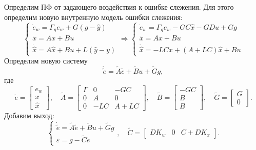 Определим ПФ от задающего воздействия к ошибке слежения. Для этого определим новую 
внутренную модель ошибки слежения:
\begin{equation*}
    \begin{cases}
        \dot e_w=\Gamma_ge_w+G(g-\hat y)\\
        \dot x=Ax+Bu\\
        \dot{\hat x}=A\hat x+Bu+L(\hat y - y)
    \end{cases}\Rightarrow
    \begin{cases}
        \dot e_w=\Gamma_ge_w-GC\hat x-GDu+Gg\\
        \dot x=Ax+Bu\\
        \dot{\hat x}=-LCx+(A+LC)\hat x+Bu
    \end{cases}
\end{equation*}
Определим новую систему
\begin{equation*}
    \dot{\tilde e}=\tilde A\tilde e+\tilde B u+\tilde Gg,
\end{equation*}
где
\begin{equation*}
    \tilde e=\begin{bmatrix}
        e_w\\x\\ \hat x
    \end{bmatrix},\quad
    \tilde A=\begin{bmatrix}
        \Gamma&0&-GC\\0&A&0\\0&-LC&A+LC
    \end{bmatrix},\quad
    \tilde B=\begin{bmatrix}
        -GC\\B\\B
    \end{bmatrix},\quad
    \tilde G=\begin{bmatrix}
        G\\0
    \end{bmatrix}.
\end{equation*}
Добавим выход:
\begin{equation*}
    \begin{cases}
        \dot{\tilde e}=\tilde A\tilde e+\tilde B u+\tilde Gg\\
        \varepsilon=g-\tilde C\tilde e
    \end{cases},\quad
    \tilde C=\begin{bmatrix}
        DK_w&0&C+DK_x
    \end{bmatrix}.
\end{equation*}
